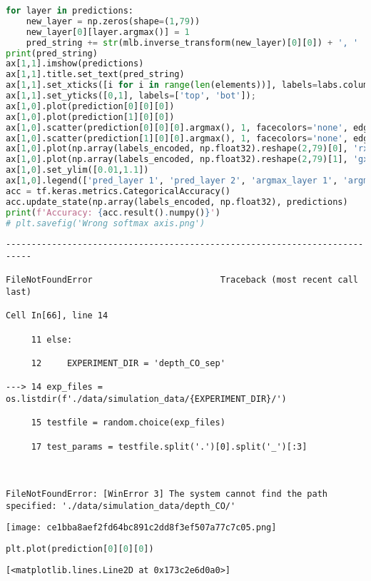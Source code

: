 \begin{lstlisting}[language=Python]
for layer in predictions:
    new_layer = np.zeros(shape=(1,79))
    new_layer[0][layer.argmax()] = 1
    pred_string += str(mlb.inverse_transform(new_layer)[0][0]) + ', '
print(pred_string)
ax[1,1].imshow(predictions)
ax[1,1].title.set_text(pred_string)
ax[1,1].set_xticks([i for i in range(len(elements))], labels=labs.columns.values, fontdict={'fontsize': 8});
ax[1,1].set_yticks([0,1], labels=['top', 'bot']); 
ax[1,0].plot(prediction[0][0][0])
ax[1,0].plot(prediction[1][0][0])
ax[1,0].scatter(prediction[0][0][0].argmax(), 1, facecolors='none', edgecolors='r')
ax[1,0].scatter(prediction[1][0][0].argmax(), 1, facecolors='none', edgecolors='g')
ax[1,0].plot(np.array(labels_encoded, np.float32).reshape(2,79)[0], 'rx')
ax[1,0].plot(np.array(labels_encoded, np.float32).reshape(2,79)[1], 'gx')
ax[1,0].set_ylim([0.01,1.1])
ax[1,0].legend(['pred_layer 1', 'pred_layer 2', 'argmax_layer 1', 'argmax_layer 2', 'true_layer 1', 'true_layer 2'])
acc = tf.keras.metrics.CategoricalAccuracy()
acc.update_state(np.array(labels_encoded, np.float32), predictions)
print(f'Accuracy: {acc.result().numpy()}')
# plt.savefig('Wrong softmax axis.png')
\end{lstlisting}

\begin{lstlisting}
---------------------------------------------------------------------------

FileNotFoundError                         Traceback (most recent call last)

Cell In[66], line 14

     11 else:

     12     EXPERIMENT_DIR = 'depth_CO_sep'

---> 14 exp_files = os.listdir(f'./data/simulation_data/{EXPERIMENT_DIR}/')

     15 testfile = random.choice(exp_files)

     17 test_params = testfile.split('.')[0].split('_')[:3]



FileNotFoundError: [WinError 3] The system cannot find the path specified: './data/simulation_data/depth_CO/'
\end{lstlisting}

\texttt{[image: ce1bba8aef2fd64bc891c2dd8f3ef507a77c7c05.png]}

\begin{lstlisting}[language=Python]
plt.plot(prediction[0][0][0])
\end{lstlisting}

\begin{lstlisting}
[<matplotlib.lines.Line2D at 0x173c2e6d0a0>]
\end{lstlisting}

